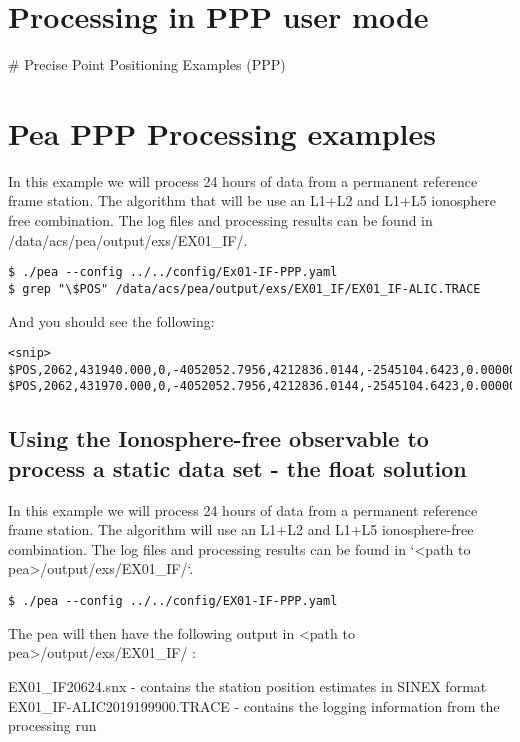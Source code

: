 \section{Processing in PPP user mode}

# Precise Point Positioning Examples (PPP)

\section{Pea PPP Processing examples}
In this example we will process 24 hours of data from a permanent reference frame station. The algorithm that will be use an L1+L2 and L1+L5 ionosphere free combination. The log files and processing results can be found in /data/acs/pea/output/exs/EX01\_IF/.

\begin{verbatim}
$ ./pea --config ../../config/Ex01-IF-PPP.yaml
$ grep "\$POS" /data/acs/pea/output/exs/EX01_IF/EX01_IF-ALIC.TRACE
\end{verbatim}

And you should see the following: 
\begin{verbatim}
<snip> $POS,2062,431940.000,0,-4052052.7956,4212836.0144,-2545104.6423,0.00000043966020,0.00000039738502,0.00000013421476 $POS,2062,431970.000,0,-4052052.7956,4212836.0144,-2545104.6423,0.00000043965772,0.00000039738393,0.00000013421667
\end{verbatim}


\subsection{Using the Ionosphere-free observable to process a static data set - the float solution}

In this example we will process 24 hours of data from a permanent reference frame station. The algorithm will use an L1+L2 and L1+L5 ionosphere-free combination.
The log files and processing results can be found in `<path to pea>/output/exs/EX01\_IF/`.
\begin{verbatim}
$ ./pea --config ../../config/EX01-IF-PPP.yaml
\end{verbatim}
The pea will then have the following output in <path to pea>/output/exs/EX01\_IF/ :

EX01\_IF20624.snx              - contains the station position estimates in SINEX format
EX01\_IF-ALIC2019199900.TRACE  - contains the logging information from the processing run

